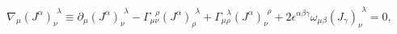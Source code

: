\begin{equation}
\label{3.3}
\nabla_\mu (J^\alpha)_\nu^{\!~~\lambda} \equiv
\partial_\mu (J^\alpha)_\nu^{\!~~\lambda} -
\Gamma_{\mu\nu}^{~~~\rho} (J^\alpha)_\rho^{\!~~\lambda} +
\Gamma_{\mu\rho}^{~~~\lambda} (J^\alpha)_\nu^{\!~~\rho} +
2 \epsilon^{\alpha\beta\gamma} \omega_{\mu \beta}
(J_\gamma)_\nu^{\!~~\lambda} = 0,
\end{equation}


